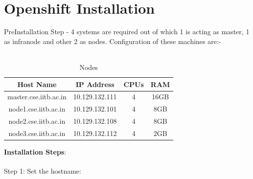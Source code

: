 \documentclass[11pt]{report}
\begin{document}
	\section{Openshift Installation}
	PreInstallation Step -
	4 systems are required out of which 1 is acting as master, 1 as infranode and other 2 as nodes.
	Configuration of these machines are:-
	\ \\
	\ \\
	\begin{table}[H]
		\begin{center}
		    \LARGE
			\begin{tabular}{|c|c|c|c|}
				\hline
				\textbf{Host Name} & \textbf{IP Address} & \textbf{CPUs} & \textbf{RAM} \\
				\hline
				master.cse.iitb.ac.in & 10.129.132.111 & 4 & 16GB  \\
				\hline
				node1.cse.iitb.ac.in & 10.129.132.101 & 4 & 8GB  \\
				\hline
				node2.cse.iitb.ac.in & 10.129.132.108 & 4 & 8GB  \\
				\hline
				node3.cse.iitb.ac.in & 10.129.132.112 & 4 & 2GB  \\
				\hline
				
			\end{tabular}
			\caption{Nodes}
		\end{center}
	\end{table}
	
	
	\textbf{Installation Steps}:
	\\
	\\
	Step 1: Set the hostname:
	
\end{document}
